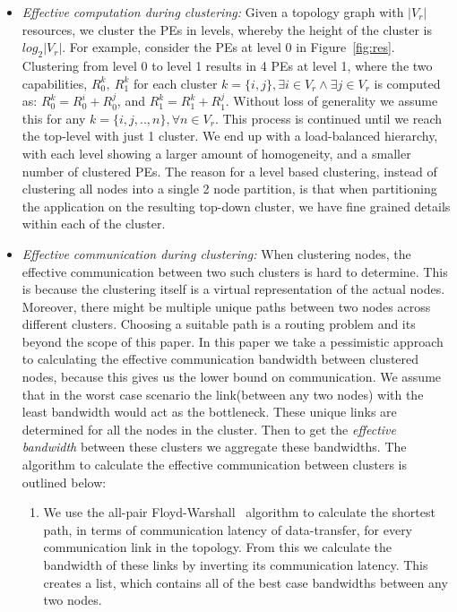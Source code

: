 \begin{itemize}

\item \textit{Effective computation during clustering:} Given a
  topology graph with $|V_r|$ resources, we cluster the PEs in levels,
  whereby the height of the cluster is $log_2|V_r|$. For example,
  consider the PEs at level 0 in Figure~\ref{fig:res}. Clustering from
  level 0 to level 1 results in 4 PEs at level 1, where the two
  capabilities, $R^k_0,\ R^k_1$ for each cluster $k = \{i, j\},
  \exists i \in V_r \wedge \exists j \in V_r$ is computed as: $R^k_0 =
  R^i_0 + R^j_0$, and $R^k_1 = R^k_1 + R^j_1$. Without loss of
  generality we assume this for any $k = \{i,j,..,n\}, \forall n \in
  V_r$. This process is continued until we reach the top-level with just
  1 cluster. We end up with a load-balanced hierarchy, with each
  level showing a larger amount of homogeneity, and a smaller number of
  clustered PEs. The reason for a level based clustering, instead of
  clustering all nodes into a single 2 node partition, is that when
  partitioning the application on the resulting top-down cluster, we
  have fine grained details within each of the cluster.

\item \textit{Effective communication during clustering:} When
  clustering nodes, the effective communication between two such clusters
  is hard to determine. This is because the clustering itself is a
  virtual representation of the actual nodes. Moreover, there might be
  multiple unique paths between two nodes across different
  clusters. Choosing a suitable path is a routing problem and its beyond
  the scope of this paper. In this paper we take a pessimistic approach to
  calculating the effective communication bandwidth between clustered
  nodes, because this gives us the lower bound on communication. We
  assume that in the worst case scenario the link(between any two nodes) with
the least
  bandwidth would act as the bottleneck. These unique links are
  determined for all the nodes in the cluster. Then to get the
  \textit{effective bandwidth} between these clusters we aggregate these
  bandwidths. The algorithm to calculate the effective communication
  between clusters is outlined below:

  \begin{enumerate}

  \item We use the all-pair Floyd-Warshall~\cite{sski08} algorithm to
    calculate the shortest path, in terms of communication latency of
    data-transfer, for every communication link in the topology. From this we
    calculate the bandwidth of these links by inverting its communication
    latency. This creates a list, which contains all of the best case
    bandwidths between any two nodes.


\end{enumerate}
\end{itemize}
